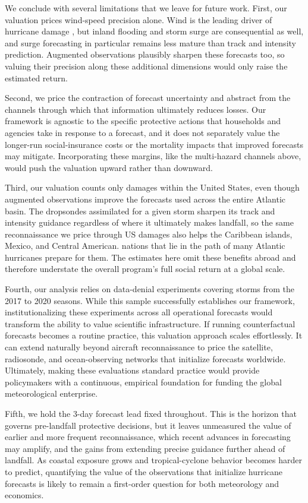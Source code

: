 \documentclass[12pt]{article}%
\begin{document}
We conclude with several limitations that we leave for future work. First, our valuation prices wind-speed precision alone. Wind is the leading driver of hurricane damage \citep{HilderbrandXie2025}, but inland flooding and storm surge are consequential as well, and surge forecasting in particular remains less mature than track and intensity prediction. Augmented observations plausibly sharpen these forecasts too, so valuing their precision along these additional dimensions would only raise the estimated return.

Second, we price the contraction of forecast uncertainty and abstract from the channels through which that information ultimately reduces losses. Our framework is agnostic to the specific protective actions that households and agencies take in response to a forecast, and it does not separately value the longer-run social-insurance costs \citep{deryugina2017fiscal} or the mortality impacts that improved forecasts may mitigate. Incorporating these margins, like the multi-hazard channels above, would push the valuation upward rather than downward.

Third, our valuation counts only damages within the United States, even though augmented observations improve the forecasts used across the entire Atlantic basin. The dropsondes assimilated for a given storm sharpen its track and intensity guidance regardless of where it ultimately makes landfall, so the same reconnaissance we price through US damages also helps the Caribbean islands, Mexico, and Central American. nations  that lie in the path of many Atlantic hurricanes prepare for them. The estimates here omit these benefits abroad and therefore understate the overall program's full social return at a global scale.

Fourth, our analysis relies on data-denial experiments covering storms from the 2017 to 2020 seasons. While this sample successfully establishes our framework, institutionalizing these experiments across all operational forecasts would transform the ability to value scientific infrastructure. If running counterfactual forecasts becomes a routine practice, this valuation approach scales effortlessly. It can extend naturally beyond aircraft reconnaissance to price the satellite, radiosonde, and ocean-observing networks that initialize forecasts worldwide. Ultimately, making these evaluations standard practice would provide policymakers with a continuous, empirical foundation for funding the global meteorological enterprise.

Fifth, we hold the 3-day forecast lead fixed throughout. This is the horizon that governs pre-landfall protective decisions, but it leaves unmeasured the value of earlier and more frequent reconnaissance, which recent advances in forecasting may amplify, and the gains from extending precise guidance further ahead of landfall. As coastal exposure grows and tropical-cyclone behavior becomes harder to predict, quantifying the value of the observations that initialize hurricane forecasts is likely to remain a first-order question for both meteorology and economics.
\end{document}
